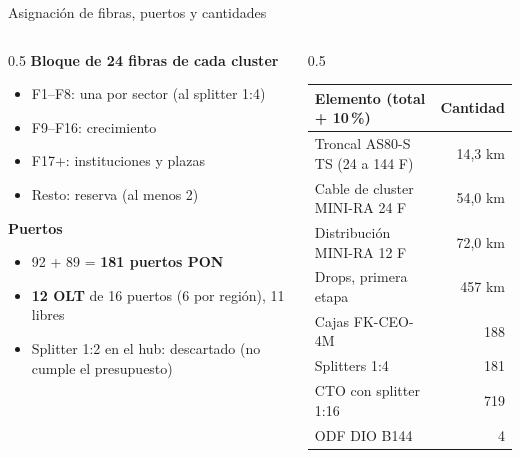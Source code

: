 \begin{frame}{Asignación de fibras, puertos y cantidades}
  \begin{columns}[T]
    \begin{column}{0.5\textwidth}
      \footnotesize
      \textbf{Bloque de 24 fibras de cada cluster}
      \begin{itemize}
        \item F1--F8: una por sector (al splitter 1:4)
        \item F9--F16: crecimiento
        \item F17+: instituciones y plazas
        \item Resto: reserva (al menos 2)
      \end{itemize}
      \textbf{Puertos}
      \begin{itemize}
        \item 92 + 89 = \textbf{181 puertos PON}
        \item \textbf{12 OLT} de 16 puertos (6 por región), 11 libres
        \item Splitter 1:2 en el hub: descartado (no cumple el presupuesto)
      \end{itemize}
    \end{column}
    \begin{column}{0.5\textwidth}
      \scriptsize
      \begin{tabular}{lr}
        \toprule
        \textbf{Elemento (total + 10\,\%)} & \textbf{Cantidad} \\
        \midrule
        Troncal AS80-S TS (24 a 144 F) & 14,3 km \\
        Cable de cluster MINI-RA 24 F & 54,0 km \\
        Distribución MINI-RA 12 F & 72,0 km \\
        Drops, primera etapa & 457 km \\
        \midrule
        Cajas FK-CEO-4M & 188 \\
        Splitters 1:4 & 181 \\
        CTO con splitter 1:16 & 719 \\
        ODF DIO B144 & 4 \\
        \bottomrule
      \end{tabular}
    \end{column}
  \end{columns}
\end{frame}

